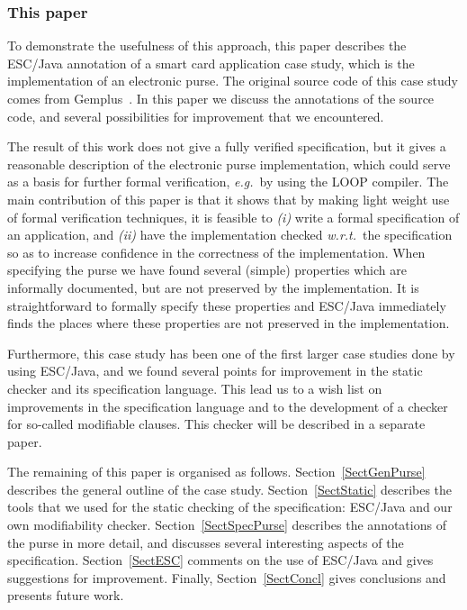 \documentclass[a4paper]{llncs}
\newcommand{\comment}[1]{\marginpar{\framebox{\begin{minipage}{\marginparwidth}{#1}\end{minipage}}}}
\begin{document}
\subsubsection{This paper}
To demonstrate the usefulness of this approach, this paper describes
the ESC/Java annotation of a smart card application case study, which
is the implementation of an electronic purse. The original source code
of this case study comes from Gemplus~\cite{PurseUrl}. In this
paper we discuss the annotations of the source code, and several
possibilities for improvement that we encountered.

The result of this work does not give a fully verified specification,
but it gives a reasonable description of the electronic purse
implementation, which could serve as a basis for further formal
verification, \emph{e.g.}~by using the LOOP compiler.  The main
contribution of this paper is that it shows that by making light
weight use of formal verification techniques, it is feasible to
\emph{(i)} write a formal specification of an application, and
\emph{(ii)} have the implementation checked \emph{w.r.t.}~the 
specification so as to increase confidence in the correctness of the
implementation. When specifying the purse we have found several
(simple) properties which are informally documented, but are not
preserved by the implementation. It is straightforward to formally
specify these properties and ESC/Java immediately finds the places
where these properties are not preserved in the implementation.

Furthermore, this case study has been one of the first larger case
studies done by using ESC/Java\comment{Is this correct?}, and we found
several points for improvement in the static checker and its
specification language. This lead us to a wish list on improvements in
the specification language and to the development of a checker for
so-called modifiable clauses. This checker will be described in a
separate paper.%

The remaining of this paper is organised as
follows. Section~\ref{SectGenPurse} describes the general outline of
the case study. Section~\ref{SectStatic} describes the tools that we
used for the static checking of the specification: ESC/Java and our
own modifiability checker. Section~\ref{SectSpecPurse} describes the
annotations of the purse in more detail, and discusses several
interesting aspects of the specification. Section~\ref{SectESC}
comments on the use of ESC/Java and gives suggestions for
improvement. Finally, Section~\ref{SectConcl} gives conclusions and
presents future work.
\end{document}
